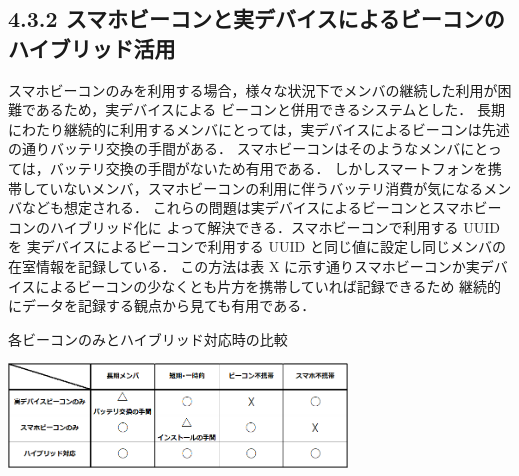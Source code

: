 \subsection*{4.3.2 スマホビーコンと実デバイスによるビーコンのハイブリッド活用}
スマホビーコンのみを利用する場合，様々な状況下でメンバの継続した利用が困難であるため，実デバイスによる
ビーコンと併用できるシステムとした．
長期にわたり継続的に利用するメンバにとっては，実デバイスによるビーコンは先述の通りバッテリ交換の手間がある．
スマホビーコンはそのようなメンバにとっては，バッテリ交換の手間がないため有用である．
しかしスマートフォンを携帯していないメンバ，スマホビーコンの利用に伴うバッテリ消費が気になるメンバなども想定される．
これらの問題は実デバイスによるビーコンとスマホビーコンのハイブリッド化に
よって解決できる．スマホビーコンで利用する UUID を
実デバイスによるビーコンで利用する UUID と同じ値に設定し同じメンバの在室情報を記録している．
この方法は表      X        に示す通りスマホビーコンか実デバイスによるビーコンの少なくとも片方を携帯していれば記録できるため
継続的にデータを記録する観点から見ても有用である．




\begin{table}[tbh]
  \centering
  \caption{各ビーコンのみとハイブリッド対応時の比較}
  \includegraphics[width=9cm]{image/table.png}
  \label{multipleBPM}
\end{table}